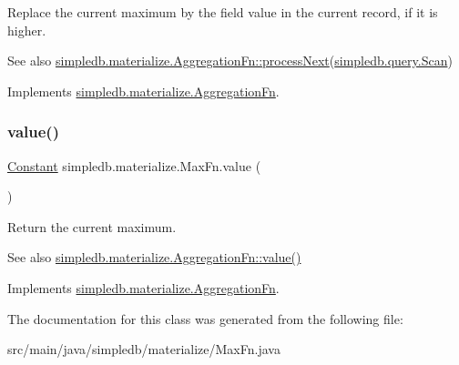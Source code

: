 Replace the current maximum by the field value in the current record, if it is higher. \begin{DoxySeeAlso}{See also}
\hyperlink{interfacesimpledb_1_1materialize_1_1AggregationFn_ae2ff3fb2b1207eab18a70ecf8ffb98dc}{simpledb.\+materialize.\+Aggregation\+Fn\+::process\+Next}(\hyperlink{interfacesimpledb_1_1query_1_1Scan}{simpledb.\+query.\+Scan}) 
\end{DoxySeeAlso}


Implements \hyperlink{interfacesimpledb_1_1materialize_1_1AggregationFn_ae2ff3fb2b1207eab18a70ecf8ffb98dc}{simpledb.\+materialize.\+Aggregation\+Fn}.

\mbox{\label{classsimpledb_1_1materialize_1_1MaxFn_a00a636276f06c0599ebbe3dbc560a4e6}} 
\subsubsection{\texorpdfstring{value()}{value()}}
{\footnotesize\ttfamily \hyperlink{classsimpledb_1_1query_1_1Constant}{Constant} simpledb.\+materialize.\+Max\+Fn.\+value (\begin{DoxyParamCaption}{ }\end{DoxyParamCaption})\hspace{0.3cm}{\ttfamily [inline]}}

Return the current maximum. \begin{DoxySeeAlso}{See also}
\hyperlink{interfacesimpledb_1_1materialize_1_1AggregationFn_a65957d8075e508ef5555e3bf6ba16184}{simpledb.\+materialize.\+Aggregation\+Fn\+::value()} 
\end{DoxySeeAlso}


Implements \hyperlink{interfacesimpledb_1_1materialize_1_1AggregationFn_a65957d8075e508ef5555e3bf6ba16184}{simpledb.\+materialize.\+Aggregation\+Fn}.



The documentation for this class was generated from the following file\+:\begin{DoxyCompactItemize}
\item 
src/main/java/simpledb/materialize/Max\+Fn.\+java\end{DoxyCompactItemize}
